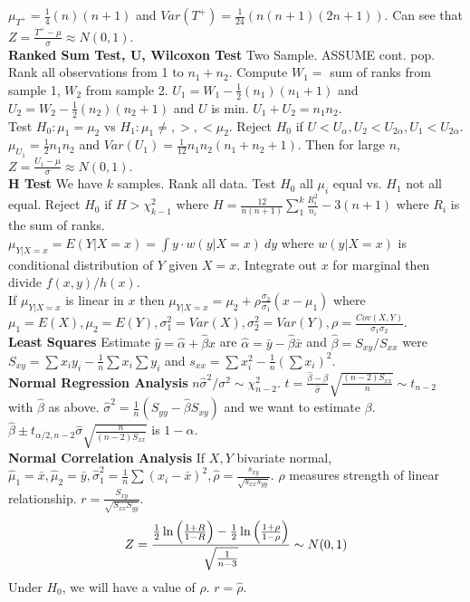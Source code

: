 \documentclass[10pt]{article}
\begin{document}
$\mu_{T^+}=\frac{1}{4}(n)(n+1)$ and $Var(T^+)=\frac{1}{24}(n(n+1)(2n+1))$. Can see that $Z=\frac{T^+-\mu}{\sigma}\approx  N(0,1)$.\\
{\bf Ranked Sum Test, U, Wilcoxon Test} Two Sample. ASSUME cont. pop. Rank all observations from 1 to $n_1+n_2$. Compute $W_1=$ sum of ranks from sample 1, $W_2$ from sample 2. $U_1=W_1-\frac{1}{2}(n_1)(n_1+1)$ and $U_2=W_2-\frac{1}{2}(n_2)(n_2+1)$ and $U$ is min. $U_1+U_2=n_1n_2$.\\ 
Test $H_0:\mu_1=\mu_2$ vs $H_1:\mu_1\neq,>,<\mu_2$. Reject $H_0$ if $U<U_{\alpha},U_2<U_{2\alpha},U_1<U_{2\alpha}$. \\
$\mu_{U_1}=\frac{1}{2}n_1n_2$ and $Var(U_1)=\frac{1}{12}n_1n_2(n_1+n_2+1)$. Then for large $n$, $Z=\frac{U_1-\mu}{\sigma}\approx N(0,1)$.\\
{\bf H Test} We have $k$ samples. Rank all data. Test $H_0$ all $\mu_i$ equal vs. $H_1$ not all equal. Reject $H_0$ if $H>\chi^2_{k-1}$ where $H=\frac{12}{n(n+1)}\sum_1^k\frac{R_i^2}{n_i}-3(n+1)$ where $R_i$ is the sum of ranks.\\
$\mu_{Y|X=x}=E(Y|X=x)=\int y\cdot w(y|X=x)\ dy$ where $w(y|X=x)$ is conditional distribution of $Y$ given $X=x$. Integrate out $x$ for marginal then divide $f(x,y)/h(x)$.\\
If $\mu_{Y|X=x}$ is linear in $x$ then $\mu_{Y|X=x}=\mu_2+\rho\frac{\sigma_2}{\sigma_1}(x-\mu_1)$ where $\mu_1=E(X),\mu_2=E(Y),\sigma_1^2=Var(X),\sigma_2^2=Var(Y), \rho=\frac{Cov(X,Y)}{\sigma_1\sigma_2}$.\\
{\bf Least Squares} Estimate $\hat y=\hat\alpha+\hat\beta x$ are $\hat\alpha=\bar y-\hat\beta\bar x$ and $\hat\beta=S_{xy}/S_{xx}$ were $S_{xy}=\sum x_iy_i-\frac{1}{n}\sum x_i\sum y_i$ and $s_{xx}=\sum x_i^2-\frac{1}{n}(\sum x_i)^2$.\\
{\bf Normal Regression Analysis} $n\hat\sigma^2/\sigma^2\sim\chi^2_{n-2}$. $t=\frac{\hat\beta-\beta}{\hat\sigma}\sqrt{\frac{(n-2)S_{xx}}{n}}\sim t_{n-2}$ with $\hat\beta$ as above. $\hat\sigma^2=\frac{1}{n}(S_{yy}-\hat\beta S_{xy})$ and we want to estimate $\beta$. $\hat\beta\pm t_{\alpha/2,n-2}\hat\sigma\sqrt{\frac{n}{(n-2)S_{xx}}}$ is $1-\alpha$.\\
{\bf Normal Correlation Analysis} If $X,Y$ bivariate normal, $\hat\mu_1=\bar x,\hat\mu_2=\bar y,\hat\sigma_1^2=\frac{1}{n}\sum (x_i-\bar x)^2,\hat\rho=\frac{s_{xy}}{\sqrt{s_{xx}s_{yy}}}$. $\rho$ measures strength of linear relationship. $r=\frac{S_{xy}}{\sqrt{S_{xx}S_{yy}}}$.\\
\begin{equation}\notag Z=\frac{\frac{1}{2}\ln\Big(\frac{1+R}{1-R}\Big)-\frac{1}{2}\ln\Big(\frac{1+\rho}{1-\rho}\Big)}{\sqrt{\frac{1}{n-3}}}\sim N(0,1)\end{equation}
Under $H_0$, we will have a value of $\rho$. $r=\hat\rho$.
\end{document}
